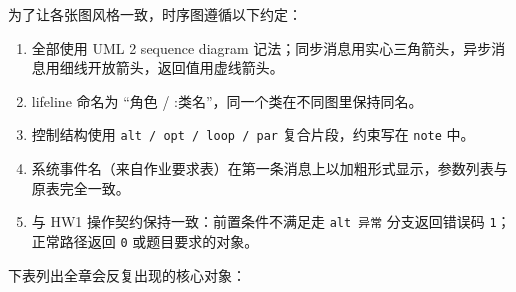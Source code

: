 \documentclass[a4paper,11pt]{ctexart}
\begin{document}
为了让各张图风格一致，时序图遵循以下约定：

\begin{enumerate}
\item 全部使用 UML 2 sequence diagram 记法；同步消息用实心三角箭头，异步消息用细线开放箭头，返回值用虚线箭头。
\item lifeline 命名为 ``角色 / :类名''，同一个类在不同图里保持同名。
\item 控制结构使用 \texttt{alt / opt / loop / par} 复合片段，约束写在 \texttt{note} 中。
\item 系统事件名（来自作业要求表）在第一条消息上以加粗形式显示，参数列表与原表完全一致。
\item 与 HW1 操作契约保持一致：前置条件不满足走 \texttt{alt 异常} 分支返回错误码 \texttt{1}；正常路径返回 \texttt{0} 或题目要求的对象。
\end{enumerate}

下表列出全章会反复出现的核心对象：
\end{document}
